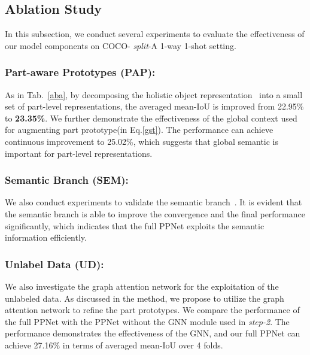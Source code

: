 \documentclass[runningheads]{llncs}
\begin{document}
\subsection{Ablation Study}\label{sec:ablation}
In this subsection, we conduct several experiments to evaluate the effectiveness of our model components on COCO- \textit{split}-A 1-way 1-shot setting.

\subsubsection{{\rm\textbf{Part-aware Prototypes (PAP):}}}As in Tab.~\ref{aba}, by decomposing the holistic object representation~\cite{wang2019panet,zhang2018sg,zhang2019canet} into a small set of part-level representations, the averaged mean-IoU is improved from 22.95\% to \textbf{23.35\%}. We further demonstrate the effectiveness of the global context used for augmenting part prototype(in Eq.\ref{gst}). The performance can achieve continuous improvement to 25.02\%, which suggests that global semantic is important for part-level representations.

\subsubsection{{\rm \textbf{Semantic Branch (SEM):}}} We also conduct experiments to validate the semantic branch~\cite{yan2019dual}. It is evident that the semantic branch is able to improve the convergence and the final performance significantly, which indicates that the full PPNet exploits the semantic information efficiently.

\subsubsection{{\rm \textbf{Unlabel Data (UD):}}} We also investigate the graph attention network for the exploitation of the unlabeled data. As discussed in the method, we propose to utilize the graph attention network to refine the part prototypes. We compare the performance of the full PPNet with the PPNet without the GNN module used in \textit{step-2}. The performance demonstrates the effectiveness of the GNN, and our full PPNet can achieve 27.16\% in terms of averaged mean-IoU over 4 folds.
\end{document}
